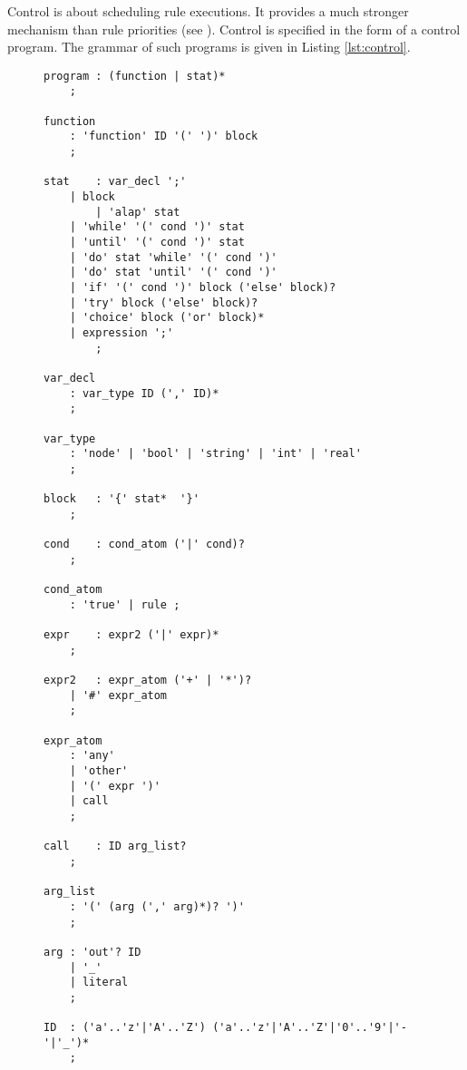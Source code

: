 Control is about scheduling rule executions. It provides a much stronger
mechanism than rule priorities (see ).  Control is
specified in the form of a control program. The grammar of such programs is
given in Listing \ref{lst:control}.

\lstset{
	basicstyle=\ttfamily\scriptsize
}

\begin{figure}
\begin{lstlisting}[label=lst:control,caption={Grammar of Control Programs}]
program	: (function | stat)*
	;

function
	: 'function' ID '(' ')' block
	;

stat	: var_decl ';'
	| block
        | 'alap' stat
	| 'while' '(' cond ')' stat
	| 'until' '(' cond ')' stat
	| 'do' stat 'while' '(' cond ')'
	| 'do' stat 'until' '(' cond ')'
	| 'if' '(' cond ')' block ('else' block)?
	| 'try' block ('else' block)?
	| 'choice' block ('or' block)*
	| expression ';'
        ;

var_decl
	: var_type ID (',' ID)*
	;

var_type
	: 'node' | 'bool' | 'string' | 'int' | 'real'
	;

block	: '{' stat*  '}'
	;

cond	: cond_atom ('|' cond)?
	;

cond_atom
	: 'true' | rule ;

expr	: expr2 ('|' expr)*
	;

expr2	: expr_atom ('+' | '*')?
	| '#' expr_atom
	;

expr_atom
	: 'any'
	| 'other'
	| '(' expr ')'
	| call
	; 

call	: ID arg_list?
	;

arg_list
	: '(' (arg (',' arg)*)? ')'
	;

arg	: 'out'? ID
	| '_'
	| literal
	;

ID	: ('a'..'z'|'A'..'Z') ('a'..'z'|'A'..'Z'|'0'..'9'|'-'|'_')*
	;
\end{lstlisting}
\end{figure}

